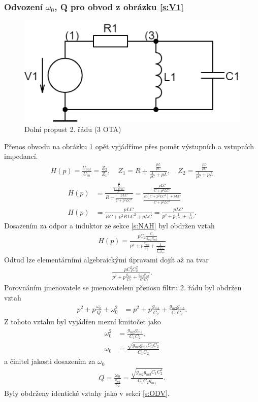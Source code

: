 \subsubsection{Odvození $\omega_0$, Q pro obvod z obrázku \ref{s:V1}}
\begin{figure}[h]
\centering
\includegraphics[scale=0.3]{rlc2(1).png}
\caption{Dolní propust 2. řádu (3 OTA) \label{s:RLC}} 
\end{figure}
\noindent Přenos obvodu na obrázku \ref{s:RLC} opět vyjádříme přes poměr výstupních a vstupních impedancí. 
\begin{align}
H(p) = \frac{U_{out}}{U_{in}} = \frac{Z_2}{Z_1}, \quad Z_1 = R + \frac{\frac{pL}{pC}}{\frac{1}{pC} + pL},\quad Z_2 = \frac{\frac{pL}{pC}}{\frac{1}{pC} + pL}
\end{align}
\begin{align}
H(p) &= \frac{\frac{\frac{L}{C}}{\frac{1 + p^2LC}{pC}}}{R + \frac{pLC}{C + p^2LC^2}} = \frac{\frac{pLC}{C + p^2LC^2}}{\frac{R(C + p^2LC^2) + pLC}{C + p^2LC^2}}\\
H(p) &= \frac{pLC}{RC + p^2RLC^2 + pLC} = \frac{pLC}{p^2 + p\frac{1}{RC} + \frac{1}{LC}}.
\end{align}
\noindent Dosazením za odpor a induktor ze sekce \ref{s:NAH} byl obdržen vztah
\begin{align}
H(p) = \frac{pC_2\frac{C_1}{g_{m2}g_{m3}}}{p^2 + p\frac{g_{m1}}{C_2} + \frac{1}{\frac{C_1C_2}{g_{m2}g_{m3}}}}
\end{align}
\noindent Odtud lze elementárními algebraickými úpravami dojít až na tvar
\begin{align}
\frac{pC_1^2C_2^2}{p^2 + p\frac{g_{m1}}{C_2} + \frac{g_{m2}g_{m3}}{C_1C_2}}.
\end{align}
Porovnáním jmenovatele se jmenovatelem přenosu filtru 2. řádu byl obdržen vztah
\begin{align}
p^2 + p\frac{\omega _0}{Q} + \omega _0^2 &= p^2 + p\frac{g_{m1}}{C_2} + \frac{g_{m2}g_{m3}}{C_1C_2}.
\end{align}
Z tohoto vztahu byl vyjádřen mezní kmitočet jako 
\begin{align}
\omega _0^2 &= \frac{g_{m2}g_{m3}}{C_1C_2}, \\
\omega _0 &= \frac{\sqrt{g_{m2}g_{m3}C_1C_2}}{C_1C_2}
\end{align}
a činitel jakosti dosazením za $\omega _0$
\begin{align}
Q = \frac{\omega _0}{\frac{g_{m1}}{C_2}} = \frac{\sqrt{g_{m2}g_{m3}C_1C_2^3}}{C_1C_2g_{m1}}.
\end{align}
Byly obdrženy identické vztahy jako v sekci \ref{s:ODV}.
